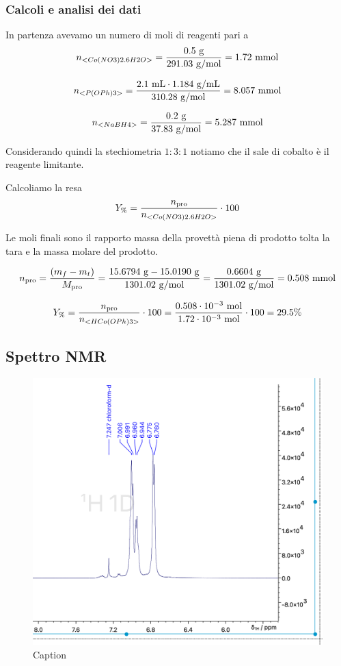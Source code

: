 \subsubsection{Calcoli e analisi dei dati}



In partenza avevamo un numero di moli di reagenti pari a
\[ n_{<Co(NO3)2.6H2O>}=\frac{0.5 \mathrm{~g}}{291.03 \mathrm{~g} / \mathrm{mol}}= 1.72 \mathrm{~mmol} \]

\[ n_{<P(OPh)3>}=\frac{2.1 \mathrm{~mL} \cdot 1.184 \mathrm{~g} / \mathrm{mL} }{310.28 \mathrm{~g} / \mathrm{mol}}= 8.057 \mathrm{~mmol} \]

\[ n_{<NaBH4>}=\frac{0.2 \mathrm{~g}  }{37.83 \mathrm{~g} / \mathrm{mol}}= 5.287 \mathrm{~mmol} \]

Considerando quindi la stechiometria $1: 3: 1$ notiamo che il sale di cobalto è il reagente limitante. 



Calcoliamo la resa 
\[ Y_\% = \frac{n_\text{pro}}{n_{<Co(NO3)2.6H2O>}}\cdot 100 \]

Le moli finali sono il rapporto massa della provettà piena di prodotto tolta la tara e la massa molare del prodotto.

\[ n_\text{pro} = \frac{(m_{f} - m_{t})}{M_\text{pro}} 
 = \frac{ 15.6794 \mathrm{\ g} - 15.0190 \mathrm{\ g} }{ 1301.02 \mathrm{\ g/mol}} =  \frac{0.6604 \mathrm{~g}}{1301.02 \mathrm{~g} / \mathrm{mol}}=0.508 \mathrm{\ mmol}\]

\[ Y_\% = \frac{n_\text{pro}}{n_{<HCo(OPh)3>}}\cdot 100  = \frac{  0.508 \cdot 10^{-3} \mathrm{~mol}}{1.72 \cdot 10^{-3} \mathrm{~mol}} \cdot 100 =29.5\%\]

\subsection{Spettro NMR}


\begin{figure}
    \centering
    \includegraphics[width=0.8\linewidth]{Relazione/foto/CoH_aromaticpeak_calc_zoom.png}
    \caption{Caption}
    \label{fig:coharomaticzoom}
\end{figure}

